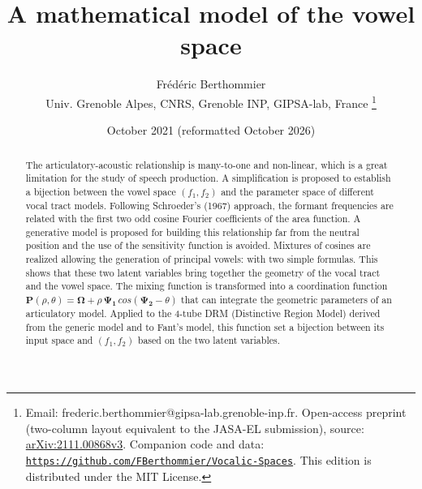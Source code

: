 \documentclass[10pt,twocolumn]{article}
\newcommand{\repobase}{https://github.com/FBerthommier/Vocalic-Spaces}
\newcommand{\repourl}{\href{\repobase}{\texttt{\repobase}}}
\begin{document}
\title{\bfseries A mathematical model of the vowel space}

\author{Fr\'ed\'eric Berthommier \\[2pt]
\small Univ. Grenoble Alpes, CNRS, Grenoble INP, GIPSA-lab, France
\thanks{Email: frederic.berthommier@gipsa-lab.grenoble-inp.fr.
Open-access preprint (two-column layout equivalent to the JASA-EL
submission), source: \href{https://arxiv.org/abs/2111.00868v3}
{arXiv:2111.00868v3}. Companion code and data: \repourl{}.
This edition is distributed under the MIT License.}}

\date{October 2021 (reformatted October 2026)}

\maketitle
\thispagestyle{plain}

\begin{abstract}
The articulatory-acoustic relationship is many-to-one and non-linear, which is a great limitation for the study of speech production. A simplification is proposed to establish a bijection between the vowel space $(f_1, f_2)$ and the parameter space of different vocal tract models. Following Schroeder's (1967) approach, the formant frequencies are related with the first two odd cosine Fourier coefficients of the area function. A generative model is proposed for building this relationship far from the neutral position and the use of the sensitivity function is avoided. Mixtures of cosines are realized allowing the generation of principal vowels: \textipa{[1, u, o, O, a, E, e, i]} with two simple formulas. This shows that these two latent variables bring together the geometry of the vocal tract and the vowel space. The mixing function is transformed into a coordination function $\bm{P}(\rho,\theta) = \bm{\Omega} + \rho\,\bm{\Psi_1}\, cos(\bm{\Psi_2} - \theta)$ that can integrate the geometric parameters of an articulatory model. Applied to the 4-tube DRM (Distinctive Region Model) derived from the generic model and to Fant's model, this function set a bijection between its input space and $(f_1, f_2)$ based on the two latent variables.
\end{abstract}
\end{document}

